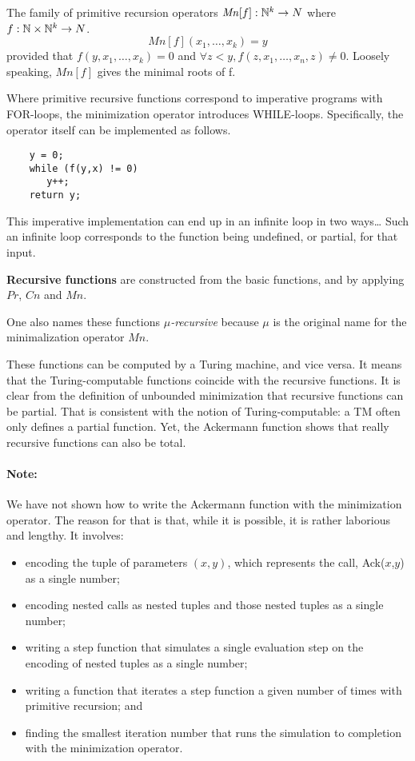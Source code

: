 The family of primitive recursion operators $\mathit{Mn}[f] : \mathbb{N}^k \to N$
where $f : \mathbb{N} \times \mathbb{N}^k \to N$.
\begin{equation*}
\mathit{Mn}[f](x_1,\ldots,x_k) = y
\end{equation*}
provided that $f(y,x_1,\ldots,x_k) = 0$ and $\forall z < y, f(z,x_1,\ldots,x_n,z) \neq 0$.
Loosely speaking, $\mathit{Mn}[f]$ gives the minimal roots of f.

Where primitive recursive functions correspond to imperative programs with FOR-loops,
the minimization operator introduces WHILE-loops. Specifically, the operator
itself can be implemented as follows.
\newpage
\begin{verbatim}
    y = 0;
    while (f(y,x) != 0)
       y++;
    return y;
\end{verbatim}
This imperative implementation can end up in an infinite loop in two
ways\ldots{} Such an infinite loop corresponds to the function being undefined,
or partial,
for that input.

\begin{definition}
{\bf Recursive functions} are constructed from the basic functions, and by
applying $\mathit{Pr}$, $\mathit{Cn}$ and $\mathit{Mn}$. 
\end{definition}
One also names these functions {\em $\mu$-recursive} because $\mu$ is the
original name for the minimalization operator $\mathit{Mn}$.

These functions can be computed by a Turing machine, and
vice versa. It means that the Turing-computable functions coincide with
the recursive functions. It is clear from the definition of unbounded
minimization that recursive functions can be partial. That is
consistent with the notion of Turing-computable: a TM often only defines
a partial function. Yet, the Ackermann function shows that really
recursive functions can also be total.

\paragraph{Note:}
We have not shown how to write the Ackermann function with the minimization
operator. The reason for that is that, while it is possible, it is rather
laborious and lengthy. It involves:
\begin{itemize}
\item encoding the tuple of parameters $(x,y)$, which represents the call,
      Ack($x$,$y$) as a single number;
\item encoding nested calls as nested tuples and those nested tuples as a single
      number;
\item writing a step function that simulates a single evaluation step on the
      encoding of nested tuples as a single number;
\item writing a function that iterates a step function a given number of times with primitive
      recursion; and
\item finding the smallest iteration number that runs the simulation to completion with
      the minimization operator.
\end{itemize}

